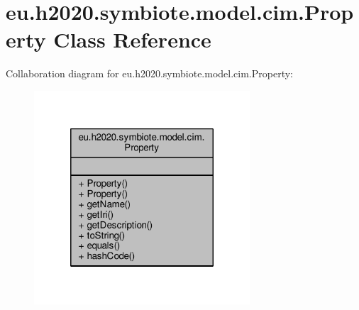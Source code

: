 \hypertarget{classeu_1_1h2020_1_1symbiote_1_1model_1_1cim_1_1Property}{}\section{eu.\+h2020.\+symbiote.\+model.\+cim.\+Property Class Reference}
\label{classeu_1_1h2020_1_1symbiote_1_1model_1_1cim_1_1Property}


Collaboration diagram for eu.\+h2020.\+symbiote.\+model.\+cim.\+Property\+:
\nopagebreak
\begin{figure}[H]
\begin{center}
\leavevmode
\includegraphics[width=228pt]{classeu_1_1h2020_1_1symbiote_1_1model_1_1cim_1_1Property__coll__graph}
\end{center}
\end{figure}
